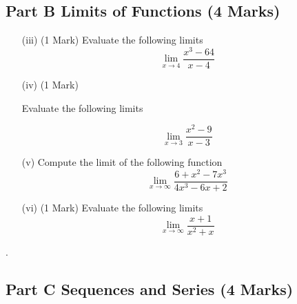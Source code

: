 \documentclass[11pt]{article} %
\begin{document}
\subsection*{Part B Limits of Functions (4 Marks)}


\begin{itemize}
\item[(iii)](1 Mark)
Evaluate the following limits
\[  \lim_{x\to 4} \frac{x^3-64}{x-4}      \]

\vspace{2cm}
\item[(iv)](1 Mark)

Evaluate the following limits

\[\lim_{x \to 3 } \frac{x^2-9}{x-3}\]  %

\end{itemize}




%
%

\newpage

\begin{enumerate}
%	
%	

	\item[(v)]  Compute the limit of the following function
	\[ \lim_{x \to \infty } \frac{6 + x^2 - 7x^3 }{4x^3 - 6x + 2} \]
	 \vspace{2cm}	
		\item[(vi)](1 Mark)
		Evaluate the following limits
		\[  \lim_{x\to \infty } \frac{x+1}{x^2+x}      \]
\end{enumerate}
\newpage
.
\newpage
\subsection*{Part C Sequences and Series (4 Marks)}
\end{document}
